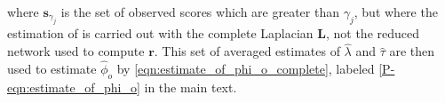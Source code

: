     \noindent where $\mathbf{s}_{\gamma_j}$ is the set of observed
    scores which are greater than $\gamma_j$, but where the estimation
    of is carried out with the complete Laplacian $\mathbf{L}$,
    not the reduced network used to compute $\mathbf{r}$. This set of
    averaged estimates of ${\hat \lambda}$ and ${\hat \tau}$ are then
    used to estimate ${\hat \phi_o}$ by \ref{eqn:estimate_of_phi_o_complete}, labeled
    \ref{P-eqn:estimate_of_phi_o} in the main text.
